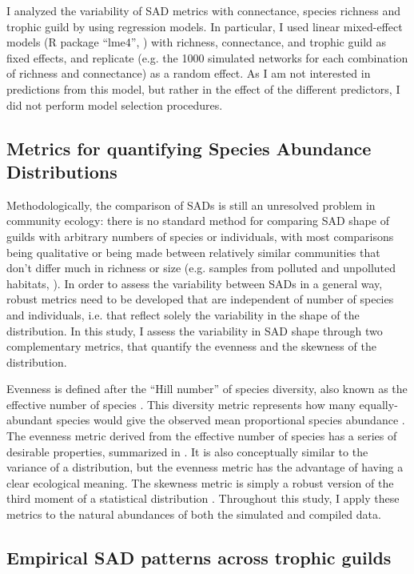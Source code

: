 I analyzed the variability of SAD metrics with connectance, species richness and trophic guild by using regression models. In particular, I used linear mixed-effect models (R package ``lme4'', \citealt{Bates2015}) with richness, connectance, and trophic guild as fixed effects, and replicate (e.g. the 1000 simulated networks for each combination of richness and connectance) as a random effect. As I am not interested in predictions from this model, but rather in the effect of the different predictors, I did not perform model selection procedures.

\subsection*{Metrics for quantifying Species Abundance Distributions}

Methodologically, the comparison of SADs is still an unresolved problem in community ecology: there is no standard method for comparing SAD shape of guilds with arbitrary numbers of species or individuals, with most comparisons being qualitative \citep{McGill2007} or being made between relatively similar communities that don’t differ much in richness or size (e.g. samples from polluted and unpolluted habitats, \citealt{Matthews2015}). In order to assess the variability between SADs in a general way, robust metrics need to be developed that are independent of number of species and individuals, i.e. that reflect solely the variability in the shape of the distribution. In this study, I assess the variability in SAD shape through two complementary metrics, that quantify the evenness and the skewness of the distribution.

Evenness is defined after the ``Hill number'' of species diversity, also known as the effective number of species \citep{Jost2006}. This diversity metric represents how many equally-abundant species would give the observed mean proportional species abundance \citep{Tuomisto2012}. The evenness metric derived from the effective number of species has a series of desirable properties, summarized in \cite{Smith1996}. It is also conceptually similar to the variance of a distribution, but the evenness metric has the advantage of having a clear ecological meaning. The skewness metric is simply a robust version of the third moment of a statistical distribution \citep{Brys2004}. Throughout this study, I apply these metrics to the natural abundances of both the simulated and compiled data.

\subsection*{Empirical SAD patterns across trophic guilds}

